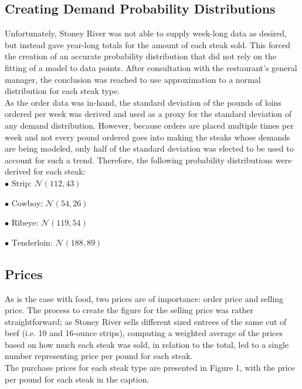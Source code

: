 \documentclass[12pt,a4paper]{article}
\begin{document}
\subsection{Creating Demand Probability Distributions}

Unfortunately, Stoney River was not able to supply week-long data as desired, but instead gave year-long totals for the amount of each steak sold. This forced the creation of an accurate probability distribution that did not rely on the fitting of a model to data points. After consultation with the restaurant's general manager, the conclusion was reached to use approximation to a normal distribution for each steak type. 
\\

As the order data was in-hand, the standard deviation of the pounds of loins ordered per week was derived and used as a proxy for the standard deviation of any demand distribution. However, because orders are placed multiple times per week and not every pound ordered goes into making the steaks whose demands are being modeled, only half of the standard deviation was elected to be used to account for such a trend. Therefore, the following probability distributions were derived for each steak:
\\

$ \bullet \text{ Strip: } \mathcal{N}(112, 43)  $

$ \bullet \text{ Cowboy: } \mathcal{N}(54, 26)  $

$ \bullet \text{ Ribeye: } \mathcal{N}(119, 54)  $

$ \bullet \text{ Tenderloin: } \mathcal{N}(188, 89)  $
\\

\subsection{Prices}

As is the case with food, two prices are of importance: order price and selling price. The process to create the figure for the selling price was rather straightforward; as Stoney River sells different sized entrees of the same cut of beef (i.e. 10 and 16-ounce strips), computing a weighted average of the prices based on how much each steak was sold, in relation to the total, led to a single number representing price per pound for each steak. 
\\

The purchase prices for each steak type are presented in Figure 1, with the price per pound for each steak in the caption.
\end{document}
